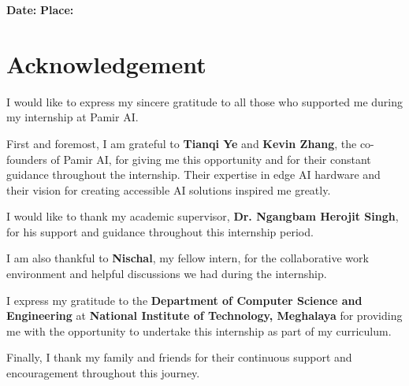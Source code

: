 \documentclass[12pt,a4paper]{report}
\begin{document}
\vspace{0.5cm}

\noindent
\textbf{Date:} \underline{\hspace{4cm}} \hspace{1cm} \textbf{Place:} \underline{\hspace{4cm}}

\newpage
\chapter*{Acknowledgement}

\vspace{1cm}

I would like to express my sincere gratitude to all those who supported me during my internship at Pamir AI.

\vspace{0.5cm}

First and foremost, I am grateful to \textbf{Tianqi Ye} and \textbf{Kevin Zhang}, the co-founders of Pamir AI, for giving me this opportunity and for their constant guidance throughout the internship. Their expertise in edge AI hardware and their vision for creating accessible AI solutions inspired me greatly.

\vspace{0.5cm}

I would like to thank my academic supervisor, \textbf{Dr. Ngangbam Herojit Singh}, for his support and guidance throughout this internship period.

\vspace{0.5cm}

I am also thankful to \textbf{Nischal}, my fellow intern, for the collaborative work environment and helpful discussions we had during the internship.

\vspace{0.5cm}

I express my gratitude to the \textbf{Department of Computer Science and Engineering} at \textbf{National Institute of Technology, Meghalaya} for providing me with the opportunity to undertake this internship as part of my curriculum.

\vspace{0.5cm}

Finally, I thank my family and friends for their continuous support and encouragement throughout this journey.
\end{document}

